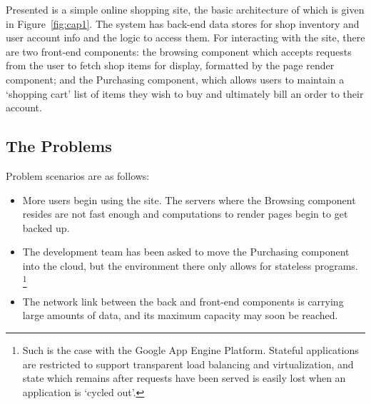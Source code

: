 \documentclass[msc,oneside]{ubcthesis}
\begin{document}
Presented is a simple online shopping site, the basic architecture of which is given in Figure~\ref{fig:cap1}. The system has back-end data stores for shop inventory and user account info and the logic to access them. For interacting with the site, there are two front-end components: the browsing component which accepts requests from the user to fetch shop items for display, formatted by the page render component; and the Purchasing component, which allows users to maintain a `shopping cart' list of items they wish to buy and ultimately bill an order to their account. 

\subsection{The Problems}

Problem scenarios are as follows:

\begin{itemize}
\item More users begin using the site. The servers where the Browsing component resides are not fast enough and computations to render pages begin to get backed up.
\item The development team has been asked to move the Purchasing component into the cloud, but the environment there only allows for stateless programs. \footnote{Such is the case with the Google App Engine Platform. Stateful applications are restricted to support transparent load balancing and virtualization, and state which remains after requests have been served is easily lost when an application is `cycled out'.}
\item The network link between the back and front-end components is carrying large amounts of data, and its maximum capacity may soon be reached.
\end{itemize}
\end{document}
